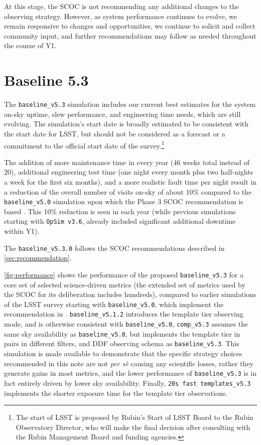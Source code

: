\documentclass[SE,lsstdraft,authoryear,toc]{lsstdoc}
\begin{document}
At this stage, the SCOC is not recommending any additional changes to the observing strategy. However, as system performance continues to evolve, we remain responsive to changes and opportunities, we continue to solicit and collect community input, and further recommendations may follow as needed throughout the course of Y1.

\section{Baseline 5.3}\label{sec:opsims}

The \texttt{baseline\_v5.3} simulation includes our current best estimates for the system on-sky uptime, slew performance, and engineering time needs, which are still evolving. The simulation’s start date is broadly estimated to be consistent with the start date for LSST, but should not be considered as a forecast or a commitment to the official start date of the survey.\footnote{The start of LSST is proposed by Rubin’s Start of LSST Board to the Rubin Observatory Director, who will make the final decision after consulting with the Rubin Management Board and funding agencies.}

The addition of more maintenance time in every year (46 weeks total instead of 20), additional engineering test time (one night every month plus two half-nights a week for the first six months), and a more realistic fault time per night result in a reduction of the overall number of visits on-sky of about 10\% compared to the \texttt{baseline\_v5.0} simulation upon which the Phase 3 SCOC recommendation is based . This 10\% reduction is seen in each year (while previous simulations starting with \texttt{OpSim v3.6}, already included significant additional downtime within Y1).

The \texttt{baseline\_v5.3.0} follows the SCOC recommendations described in \autoref{sec:recommendation}.


 \autoref{fig:performance} shows the performance of the proposed \texttt{baseline\_v5.3} for a core set of selected science-driven metrics (the extended set of metrics used by the SCOC for its deliberation includes hundreds), compared to earlier simulations of the LSST survey starting with \texttt{baseline\_v5.0}, which implement the recommendation in .  \texttt{baseline\_v5.1.2} introduces the template tier observing mode, and is otherwise consistent with \texttt{baseline\_v5.0}, \texttt{comp\_v5.3} assumes the same sky availability as \texttt{baseline\_v5.0}, but implements the template tier in pairs in different filters, and DDF observing schema as \texttt{baseline\_v5.3}. This simulation is made available to demonstrate that the specific strategy choices recommended in this note are not \emph{per sè} causing any scientific losses, rather they generate gains in most metrics, and the lower performance of \texttt{baseline\_v5.3} is in fact entirely driven by lower sky availability. Finally, \texttt{20s fast templates\_v5.3} implements the shorter exposure time for the template tier observations.
\end{document}
